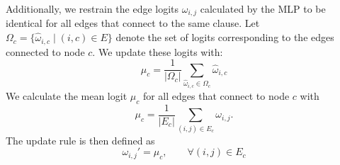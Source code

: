 Additionally, we restrain the edge logits $\omega_{i,j}$ calculated by the MLP to be identical for all edges that connect to the same clause. Let $\Omega_c = \{\hat{\omega}_{i,c} \mid (i,c)\in E\}$ denote the set of logits corresponding to the edges connected to node $c$. We update these logits with:
\begin{equation}
    \mu_c = \frac{1}{|\Omega_c|} \sum_{\hat{\omega}_{i,c} \in \Omega_c} \hat{\omega}_{i,c}
\end{equation}
We calculate the mean logit $\mu_c$ for all edges that connect to node $c$ with
\begin{equation}
    \mu_c = \frac{1}{|E_c|} \sum_{(i,j)\in E_c}\omega_{i,j}.
\end{equation}
The update rule is then defined as 
\begin{equation}
    \omega_{i,j}' =\mu_c, \qquad \forall(i,j) \in E_c
\end{equation}